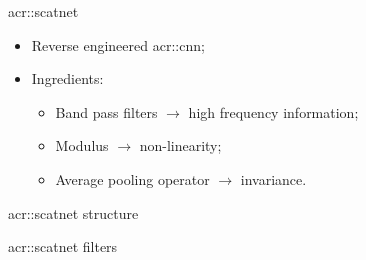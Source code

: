 \documentclass[12pt]{beamer}
\begin{document}
            \begin{frame}{\texorpdfstring{\acrshort*{acr::scatnet}}{ScatNet}}
                \begin{itemize}[label=\(\blacktriangleright\), font=\color{IGNGreen}]
                    \item<1-> Reverse engineered \acrfull{acr::cnn};
                    \item<2-> Ingredients: 
                    \begin{itemize}[label=\(\blacktriangleright\), font=\color{IGNGreen}]
                        \item<3-> Band pass filters \(\longrightarrow\) high frequency information;
                        \item<4-> Modulus \(\longrightarrow\) non-linearity;
                        \item<5-> Average pooling operator \(\longrightarrow\) invariance.
                    \end{itemize}
                \end{itemize}
            \end{frame}
            
            \begin{frame}{\texorpdfstring{\acrshort*{acr::scatnet}}{ScatNet} structure}
                \centering
                
            \end{frame}

            \begin{frame}{\texorpdfstring{\acrshort*{acr::scatnet}}{ScatNet} filters}
                \centering
            \end{frame}
\end{document}
